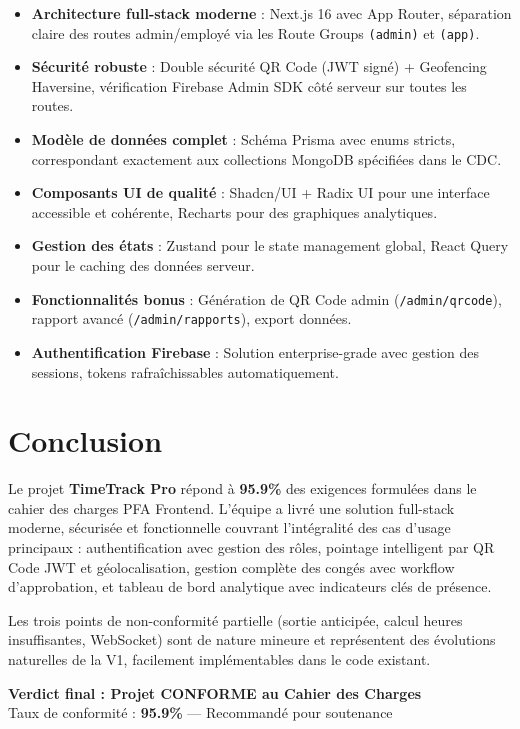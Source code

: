 \documentclass[12pt,a4paper]{article}
\newcommand{\cmark}{\textcolor{vert}{\ding{51}}}
\begin{document}
\begin{itemize}[leftmargin=*, label=\cmark]
    \item \textbf{Architecture full-stack moderne} : Next.js 16 avec App Router, séparation claire des routes admin/employé via les Route Groups \texttt{(admin)} et \texttt{(app)}.
    \item \textbf{Sécurité robuste} : Double sécurité QR Code (JWT signé) + Geofencing Haversine, vérification Firebase Admin SDK côté serveur sur toutes les routes.
    \item \textbf{Modèle de données complet} : Schéma Prisma avec enums stricts, correspondant exactement aux collections MongoDB spécifiées dans le CDC.
    \item \textbf{Composants UI de qualité} : Shadcn/UI + Radix UI pour une interface accessible et cohérente, Recharts pour des graphiques analytiques.
    \item \textbf{Gestion des états} : Zustand pour le state management global, React Query pour le caching des données serveur.
    \item \textbf{Fonctionnalités bonus} : Génération de QR Code admin (\texttt{/admin/qrcode}), rapport avancé (\texttt{/admin/rapports}), export données.
    \item \textbf{Authentification Firebase} : Solution enterprise-grade avec gestion des sessions, tokens rafraîchissables automatiquement.
\end{itemize}

\section{Conclusion}

Le projet \textbf{TimeTrack Pro} répond à \textbf{95.9\%} des exigences formulées dans le cahier des charges PFA Frontend. L'équipe a livré une solution full-stack moderne, sécurisée et fonctionnelle couvrant l'intégralité des cas d'usage principaux : authentification avec gestion des rôles, pointage intelligent par QR Code JWT et géolocalisation, gestion complète des congés avec workflow d'approbation, et tableau de bord analytique avec indicateurs clés de présence.

Les trois points de non-conformité partielle (sortie anticipée, calcul heures insuffisantes, WebSocket) sont de nature mineure et représentent des évolutions naturelles de la V1, facilement implémentables dans le code existant.

\vspace{1cm}
\begin{tcolorbox}[colback=green!8, colframe=vert]
\centering
\textbf{Verdict final : Projet CONFORME au Cahier des Charges}\\
\small Taux de conformité : \textbf{95.9\%} — Recommandé pour soutenance
\end{tcolorbox}
\end{document}
